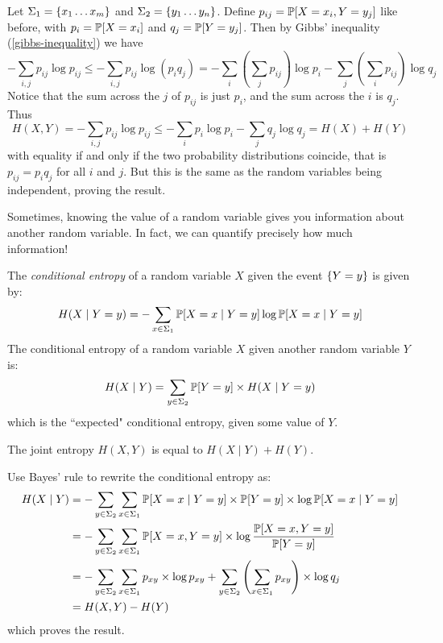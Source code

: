 \documentclass{article}
\begin{document}
\begin{prf}
    Let $\Sigma_1 = \set{x_1 \dots x_m}$
    and $\Sigma_2 = \set{y_1 \dots y_n}$.
    Define $p_{ij} = \P[X = x_i, Y = y_j]$ like before,
    with $p_i = \P[X = x_i]$ and $q_j = \P[Y = y_j]$.
    Then by Gibbs' inequality (\ref{gibbs-inequality}) we have
    \[
	-\sum_{i,j} p_{ij} \log p_{ij} \leq
	-\sum_{i,j} p_{ij} \log (p_iq_j) =
	-\sum_i \left( \sum_j p_{ij} \right) \log p_i
	-\sum_j \left( \sum_i p_{ij} \right) \log q_j 
	\]
	Notice that the sum across the $j$ of $p_{ij}$ is just $p_i$,
	and the sum across the $i$ is $q_j$. Thus
	\[
	H(X, Y) =
	-\sum_{i,j} p_{ij} \log p_{ij} \leq
	-\sum_i p_i \log p_i - \sum_j q_j \log q_j =
	H(X) + H(Y)
	\]
	with equality if and only if the two probability distributions coincide,
	that is $p_{ij} = p_i q_j$ for all $i$ and $j$.
	But this is the same as the random variables being independent,
	proving the result.
\end{prf}

Sometimes, knowing the value of a random variable
gives you information about another random variable.
In fact, we can quantify precisely how much information!

\begin{definition}
    The \textit{conditional entropy} of a random variable $X$
    given the event $\set{Y = y}$ is given by:
    \[
	H(X \mid Y = y) =
	-\sum_{x \in \Sigma_1} \P[X = x \mid Y = y] \log \P[X = x \mid Y = y]
	\]
	The conditional entropy of a random variable $X$
	given another random variable $Y$ is:
	\[
	H(X \mid Y) =
	\sum_{y \in \Sigma_2} \P[Y = y] \times H(X \mid Y = y)
	\]
	which is the ``expected" conditional entropy, given some value of $Y$.
\end{definition}

\begin{proposition}
	\label{conditional-entropy-equality}
    The joint entropy $H(X, Y)$ is equal to $H(X \mid Y) + H(Y)$.
\end{proposition}

\begin{prf}
    Use Bayes' rule to rewrite the conditional entropy as:
    \begin{align*}
    	H(X \mid Y)
    	&= -\sum_{y \in \Sigma_2}\sum_{x \in \Sigma_1}
    	\P[X = x \mid Y = y] \times \P[Y = y] \times \log \P[X = x \mid Y = y] \\
    	&= -\sum_{y \in \Sigma_2}\sum_{x \in \Sigma_1} \P[X = x, Y = y]
    	\times \log \frac{\P[X = x, Y = y] }{\P[Y=y]} \\
    	&= -\sum_{y \in \Sigma_2}\sum_{x \in \Sigma_1} p_{xy}
    	\times \log p_{xy}
    	+ \sum_{y \in \Sigma_2} \left( \sum_{x \in \Sigma_1} p_{xy} \right)
    	\times \log q_j \\
    	&= H(X, Y) - H(Y)
	\end{align*}
	which proves the result.
\end{prf}
\end{document}

